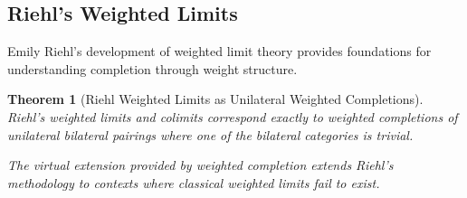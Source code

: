 \documentclass[11pt]{article}
\theoremstyle{plain}
\newtheorem{theorem}{Theorem}[section]
\theoremstyle{definition}
\theoremstyle{remark}
\begin{document}
\subsection{Riehl's Weighted Limits}

Emily Riehl's development of weighted limit theory \cite{riehl2008weighted,riehl2014categorical} provides foundations for understanding completion through weight structure.

\begin{theorem}[Riehl Weighted Limits as Unilateral Weighted Completions]\label{thm:riehl-correspondence}
Riehl's weighted limits and colimits correspond exactly to weighted completions of unilateral bilateral pairings where one of the bilateral categories is trivial.

The virtual extension provided by weighted completion extends Riehl's methodology to contexts where classical weighted limits fail to exist.
\end{theorem}
\end{document}
